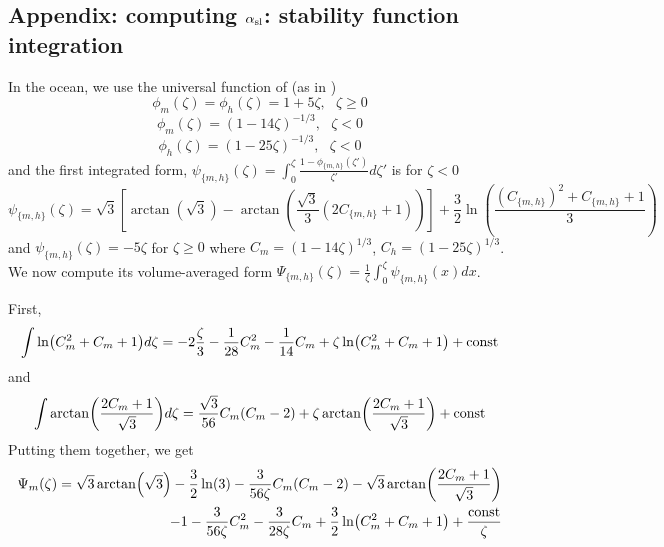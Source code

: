 \begin{subappendices}
\section{Appendix: computing $\alpha_{\rm sl}$: stability function integration}
\label{sec:ND_Ocean_stabilityFunctionIntegration}
In the ocean, we use the universal function of \citep{large_similarity_2019} (as in \citep{pelletier_two-sided_2021})
\begin{equation}
	\phi_m(\zeta) = \phi_h(\zeta) = 1+5\zeta, ~~~ \zeta \geq 0
\end{equation}
\begin{equation}
	\phi_m(\zeta) = (1-14\zeta)^{-1/3}, ~~~ \zeta < 0
\end{equation}
\begin{equation}
	\phi_h(\zeta) = (1-25\zeta)^{-1/3}, ~~~ \zeta < 0
\end{equation}
and the first integrated form, $\psi_{\{m,h\}}(\zeta)= \int_0^\zeta \frac{1-\phi_{\{m,h\}}(\zeta')}{\zeta'}d\zeta'$ is for $\zeta<0$
\begin{equation}
	\psi_{\{m,h\}}(\zeta)  = \sqrt{3}\left[\arctan(\sqrt{3}) -
	\arctan\left(\frac{\sqrt{3}}{3}(2C_{\{m,h\}}+1)\right)\right]
	+ \frac{3}{2}\ln \left(\frac{(C_{\{m,h\}})^2 + C_{\{m,h\}} + 1}{3}\right)
\end{equation}
and $\psi_{\{m,h\}}(\zeta) = -5\zeta$ for $\zeta \geq 0$
where $C_m = (1-14\zeta)^{1/3}$, $C_h = (1-25\zeta)^{1/3}$.
We now compute its volume-averaged form $\Psi_{\{m,h\}}(\zeta)= \frac{1}{\zeta}\int_0^\zeta \psi_{\{m,h\}}(x)dx$.
\par
First,
\begin{equation}
	\int \ln (C_m^2+C_m+1)d\zeta
	= -2 \frac{\zeta}{3} - \frac{1}{28}C_m^2 - \frac{1}{14}C_m
	+\zeta\ln (C_m^2+C_m+1) + {\rm const}
\end{equation}
and
\begin{equation}
	\int \arctan (\frac{2C_m+1}{\sqrt{3}})d\zeta
	= \frac{\sqrt{3}}{56}C_m(C_m-2)
	+ \zeta \arctan (\frac{2C_m+1}{\sqrt{3}}) + {\rm const}
\end{equation}
Putting them together, we get
\begin{equation}
\begin{aligned}
	\Psi_m(\zeta)=\sqrt{3}\arctan(\sqrt{3})- 
	\frac{3}{2}\ln(3) -
	\frac{3}{56\zeta}C_m(C_m-2)
	- \sqrt{3} \arctan (\frac{2C_m+1}{\sqrt{3}})
	\\
	-1 - \frac{3}{56\zeta}C_m^2 - \frac{3}{28\zeta}C_m
	+\frac{3}{2}\ln (C_m^2+C_m+1)
	+ \frac{{\rm const}}{\zeta}

\end{aligned}
\end{equation}
\end{subappendices}

